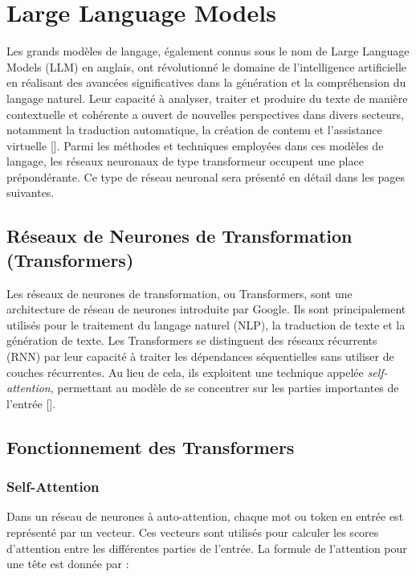 \section{Large Language Models}
Les grands modèles de langage, également connus sous le nom de Large Language
Models (LLM) en anglais, ont révolutionné le domaine de l'intelligence
artificielle en réalisant des avancées significatives dans la génération et la
compréhension du langage naturel. Leur capacité à analyser, traiter et produire
du texte de manière contextuelle et cohérente a ouvert de nouvelles
perspectives dans divers secteurs, notamment la traduction automatique, la
création de contenu et l'assistance virtuelle [\cite{naveed2023overview}].
Parmi les méthodes et techniques employées dans ces modèles de langage, les
réseaux neuronaux de type transformeur occupent une place prépondérante. Ce
type de réseau neuronal sera présenté en détail dans les pages suivantes.

\subsection{Réseaux de Neurones de Transformation (Transformers)}

Les réseaux de neurones de transformation, ou Transformers, sont une
architecture de réseau de neurones introduite par Google. Ils sont
principalement utilisés pour le traitement du langage naturel (NLP), la
traduction de texte et la génération de texte. Les Transformers se distinguent
des réseaux récurrents (RNN) par leur capacité à traiter les dépendances
séquentielles sans utiliser de couches récurrentes. Au lieu de cela, ils
exploitent une technique appelée \textit{self-attention}, permettant au modèle
de se concentrer sur les parties importantes de l'entrée
[\cite{attention_is_all_you_need}].

\subsection{Fonctionnement des Transformers}

\subsubsection{Self-Attention}

Dans un réseau de neurones à auto-attention, chaque mot ou token en entrée est
représenté par un vecteur. Ces vecteurs sont utilisés pour calculer les scores
d’attention entre les différentes parties de l’entrée. La formule de
l’attention pour une tête est donnée par :

